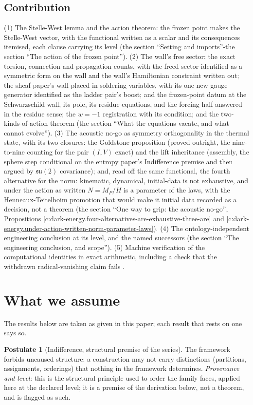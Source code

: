 \documentclass[11pt]{article}
\theoremstyle{definition}
\newtheorem{postulate}[theorem]{Postulate}
\theoremstyle{plain}
\begin{document}
\subsection*{Contribution}
\label{c:note.dark-energy.setting-contribution}
(1) The Stelle-West lemma and the action theorem: the frozen point makes the Stelle-West vector, with the functional written as a scalar and its consequences itemised, each clause carrying its level (the section ``Setting and imports''-the section ``The action of the frozen point''). (2) The wall's free sector: the exact torsion, connection and propagation counts, with the freed sector identified as a symmetric form on the wall and the wall's Hamiltonian constraint written out; the sheaf paper's wall placed in soldering variables, with its one new gauge generator identified as the ladder pair's boost; and the frozen-point datum at the Schwarzschild wall, its pole, its residue equations, and the forcing half answered in the residue sense; the $w = -1$ registration with its condition; and the two-kinds-of-action theorem (the section ``What the equations vacate, and what cannot evolve''). (3) The acoustic no-go as symmetry orthogonality in the thermal state, with its two closures: the Goldstone proposition (proved outright, the nine-to-nine counting for the pair $(I,V)$ exact) and the lift inheritance (assembly, the sphere step conditional on the entropy paper's Indifference premise and then argued by $\mathfrak{su}(2)$ covariance); and, read off the same functional, the fourth alternative for the norm: kinematic, dynamical, initial-data is not exhaustive, and under the action as written $N = M_P/H$ is a parameter of the laws, with the Henneaux-Teitelboim promotion that would make it initial data recorded as a decision, not a theorem (the section ``One way to grip: the acoustic no-go'', Propositions \ref{c:dark-energy.four-alternatives-are-exhaustive-three-are} and \ref{c:dark-energy.under-action-written-norm-parameter-laws}). (4) The ontology-independent engineering conclusion at its level, and the named successors (the section ``The engineering conclusion, and scope''). (5) Machine verification of the computational identities in exact arithmetic, including a check that the withdrawn radical-vanishing claim fails \cite{ButlerVerifyT10}.

\section*{What we assume}
The results below are taken as given in this paper; each result that rests on one says so.
\begin{postulate}[Indifference, structural premise of the series]\label{c:scrambling.indifference-structural-premise-series}
The framework forbids uncaused structure: a construction may not carry distinctions (partitions, assignments, orderings) that nothing in the framework determines. \emph{Provenance and level:} this is the structural principle used to order the family faces, applied here at the declared level; it is a premise of the derivation below, not a theorem, and is flagged as such.
\end{postulate}
\end{document}
